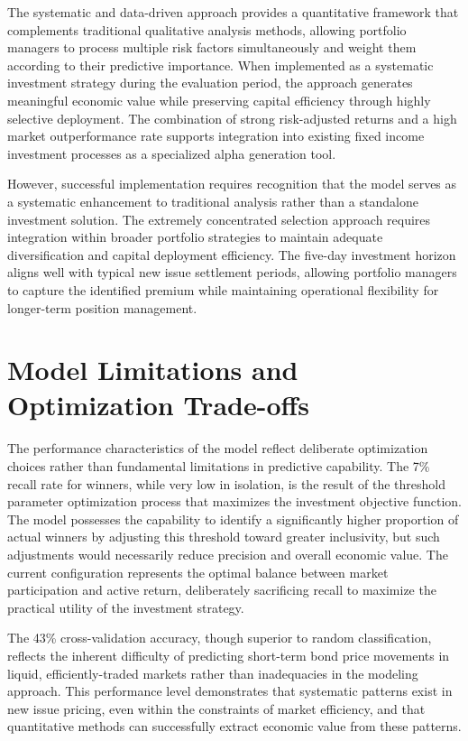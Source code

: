 The systematic and data-driven approach provides a quantitative framework that complements traditional qualitative analysis methods, allowing portfolio managers to process multiple risk factors simultaneously and weight them according to their predictive importance. When implemented as a systematic investment strategy during the evaluation period, the approach generates meaningful economic value while preserving capital efficiency through highly selective deployment. The combination of strong risk-adjusted returns and a high market outperformance rate supports integration into existing fixed income investment processes as a specialized alpha generation tool.

However, successful implementation requires recognition that the model serves as a systematic enhancement to traditional analysis rather than a standalone investment solution. The extremely concentrated selection approach requires integration within broader portfolio strategies to maintain adequate diversification and capital deployment efficiency. The five-day investment horizon aligns well with typical new issue settlement periods, allowing portfolio managers to capture the identified premium while maintaining operational flexibility for longer-term position management.

\section{Model Limitations and Optimization Trade-offs}

The performance characteristics of the model reflect deliberate optimization choices rather than fundamental limitations in predictive capability. The 7\% recall rate for winners, while very low in isolation, is the result of the threshold parameter optimization process that maximizes the investment objective function. The model possesses the capability to identify a significantly higher proportion of actual winners by adjusting this threshold toward greater inclusivity, but such adjustments would necessarily reduce precision and overall economic value. The current configuration represents the optimal balance between market participation and active return, deliberately sacrificing recall to maximize the practical utility of the investment strategy.

The 43\% cross-validation accuracy, though superior to random classification, reflects the inherent difficulty of predicting short-term bond price movements in liquid, efficiently-traded markets rather than inadequacies in the modeling approach. This performance level demonstrates that systematic patterns exist in new issue pricing, even within the constraints of market efficiency, and that quantitative methods can successfully extract economic value from these patterns.

